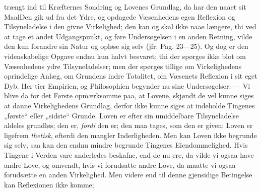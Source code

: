 \documentclass[12pt]{book}
\newcommand{\opage}[1]{\marginnote{\footnotesize\textit{[#1]}}}
\begin{document}
trængt ind til Kræfternes Sondring og Lovenes Grundlag, da har den naaet sit Maal\quad Den
gik ud fra det Ydre, og opdagede Væsenhedens egen Reflexion og Tilsyneladelse i den givne
Virkelighed; den kan og skal ikke naae længere, thi ved at tage et andet Udgangspunkt, og
føre Undersøgelsen i en anden
\opage{146} %
Retning, vilde den kun forandre sin Natur og opløse sig selv (jfr. Pag. 23---25). Og dog er
den videnskabelige Opgave endnu kun halvt besvaret; thi der spørges ikke blot om Væsenhedens
ydre Tilsyneladelser; men der spørges tillige om Virkelighedens oprindelige Anlæg, om
Grundens indre Totalitet, om Væsenets Reflexion i sit eget Dyb. Her tier Empirien, og
Philosophien begynder nu sine Undersøgelser. --- Vi blive da for det Første opmærksomme paa,
at Lovene, skjøndt de vel kunne siges at danne Virkelighedens Grundlag, derfor ikke kunne
siges at indeholde Tingenes „første“ eller „sidste“ Grunde. Loven er efter sin umiddelbare
Tilsyneladelse aldeles grundløs; den er, \emph{fordi} den er; den maa tages, som den er
given; Loven er ligefrem \emph{thetisk}, efterdi den mangler Inderligheden. Men kan Loven
ikke begrunde sig selv, saa kan den endnu mindre begrunde Tingenes Eiendommelighed. Hvis
Tingene i Verden vare anderledes beskafne, end de nu ere, da vilde vi ogsaa have andre Love,
og omvendt, hvis vi forudsatte andre Love, da maatte vi ogsaa forudsætte en anden
Virkelighed. Men videre end til denne gjensidige Betingelse kan Reflexionen ikke komme;
\end{document}

